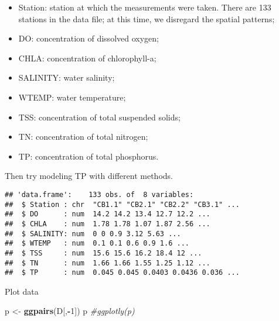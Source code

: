 \documentclass[
]{book}
\newenvironment{Shaded}{\begin{snugshade}}{\end{snugshade}}
\newcommand{\CommentTok}[1]{\textcolor[rgb]{0.56,0.35,0.01}{\textit{#1}}}
\newcommand{\DecValTok}[1]{\textcolor[rgb]{0.00,0.00,0.81}{#1}}
\newcommand{\KeywordTok}[1]{\textcolor[rgb]{0.13,0.29,0.53}{\textbf{#1}}}
\newcommand{\NormalTok}[1]{#1}
\newcommand{\OperatorTok}[1]{\textcolor[rgb]{0.81,0.36,0.00}{\textbf{#1}}}
\newcommand{\StringTok}[1]{\textcolor[rgb]{0.31,0.60,0.02}{#1}}
\providecommand{\tightlist}{%
  \setlength{\itemsep}{0pt}\setlength{\parskip}{0pt}}
\begin{document}
\begin{itemize}
\tightlist
\item
  Station: station at which the measurements were taken. There are 133 stations in the data file; at this time, we disregard the spatial patterns;
\item
  DO: concentration of dissolved oxygen;
\item
  CHLA: concentration of chlorophyll-a;
\item
  SALINITY: water salinity;
\item
  WTEMP: water temperature;
\item
  TSS: concentration of total suspended solids;
\item
  TN: concentration of total nitrogen;
\item
  TP: concentration of total phosphorus.
\end{itemize}

Then try modeling TP with different methods.

\begin{Shaded}
\end{Shaded}

\begin{verbatim}
## 'data.frame':    133 obs. of  8 variables:
##  $ Station : chr  "CB1.1" "CB2.1" "CB2.2" "CB3.1" ...
##  $ DO      : num  14.2 14.2 13.4 12.7 12.2 ...
##  $ CHLA    : num  1.78 1.78 1.07 1.87 2.56 ...
##  $ SALINITY: num  0 0 0.9 3.12 5.63 ...
##  $ WTEMP   : num  0.1 0.1 0.6 0.9 1.6 ...
##  $ TSS     : num  15.6 15.6 16.2 18.4 12 ...
##  $ TN      : num  1.66 1.66 1.55 1.25 1.12 ...
##  $ TP      : num  0.045 0.045 0.0403 0.0436 0.036 ...
\end{verbatim}

Plot data

\begin{Shaded}
\begin{Highlighting}[]
\NormalTok{p <-}\StringTok{ }\KeywordTok{ggpairs}\NormalTok{(D[,}\OperatorTok{-}\DecValTok{1}\NormalTok{])}
\NormalTok{p }\CommentTok{#ggplotly(p)}
\end{Highlighting}
\end{Shaded}
\end{document}
